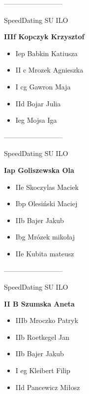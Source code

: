 \documentclass[a4paper,10pt]{article}
\begin{document}
\begin{multicols}{3}
\begin{minipage}[l]{\textwidth}
\end{minipage}



\begin{minipage}[l]{\textwidth}
--------------------------

  \footnotesize{SpeedDating SU ILO}

  \bfseries{IIIf Kopczyk Krzysztof}

  \begin{itemize}
    \item Iep Babkin Katiusza
    \item II c Mrozek Agnieszka
    \item I cg Gawron Maja
    \item IId Bojar Julia
    \item Ieg Mojsa Iga

    \end{itemize}



\end{minipage}



\begin{minipage}[l]{\textwidth}
--------------------------

  \footnotesize{SpeedDating SU ILO}

  \bfseries{Iap Goliszewska Ola}

  \begin{itemize}
    \item IIe Skoczylas Maciek
    \item Ibp Olesiński Maciej
    \item IIb Bajer Jakub
    \item Ibg Mrózek mikołaj
    \item IIe Kubita mateusz

    \end{itemize}



\end{minipage}



\begin{minipage}[l]{\textwidth}
--------------------------

  \footnotesize{SpeedDating SU ILO}

  \bfseries{II B Szumska Aneta}

  \begin{itemize}
    \item IIIb Mroczko Patryk
    \item IIb Roetkegel Jan
    \item IIb Bajer Jakub
    \item I eg Kleibert Filip
    \item IId Pancewicz Miłosz


\end{itemize}
\end{minipage}
\end{multicols}
\end{document}
